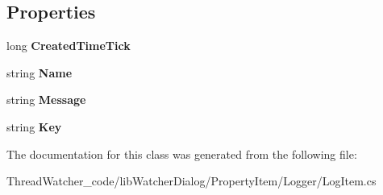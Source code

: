 \subsection*{Properties}
\begin{DoxyCompactItemize}
\item 
\hypertarget{classlib_watcher_dialog_1_1_property_item_1_1_logger_1_1_log_item_ab1713c0b434ab6718df0384f38c399ae}{long {\bfseries Created\+Time\+Tick}}\label{classlib_watcher_dialog_1_1_property_item_1_1_logger_1_1_log_item_ab1713c0b434ab6718df0384f38c399ae}

\item 
\hypertarget{classlib_watcher_dialog_1_1_property_item_1_1_logger_1_1_log_item_aa4d446f990880be4421053ad61d9e52b}{string {\bfseries Name}}\label{classlib_watcher_dialog_1_1_property_item_1_1_logger_1_1_log_item_aa4d446f990880be4421053ad61d9e52b}

\item 
\hypertarget{classlib_watcher_dialog_1_1_property_item_1_1_logger_1_1_log_item_ae5958d2c1737c9f001b347ed21bb4f6a}{string {\bfseries Message}}\label{classlib_watcher_dialog_1_1_property_item_1_1_logger_1_1_log_item_ae5958d2c1737c9f001b347ed21bb4f6a}

\item 
\hypertarget{classlib_watcher_dialog_1_1_property_item_1_1_logger_1_1_log_item_a64f8b31afc9e49f51baee15747956c9e}{string {\bfseries Key}}\label{classlib_watcher_dialog_1_1_property_item_1_1_logger_1_1_log_item_a64f8b31afc9e49f51baee15747956c9e}

\end{DoxyCompactItemize}


The documentation for this class was generated from the following file\+:\begin{DoxyCompactItemize}
\item 
Thread\+Watcher\+\_\+code/lib\+Watcher\+Dialog/\+Property\+Item/\+Logger/Log\+Item.\+cs\end{DoxyCompactItemize}
